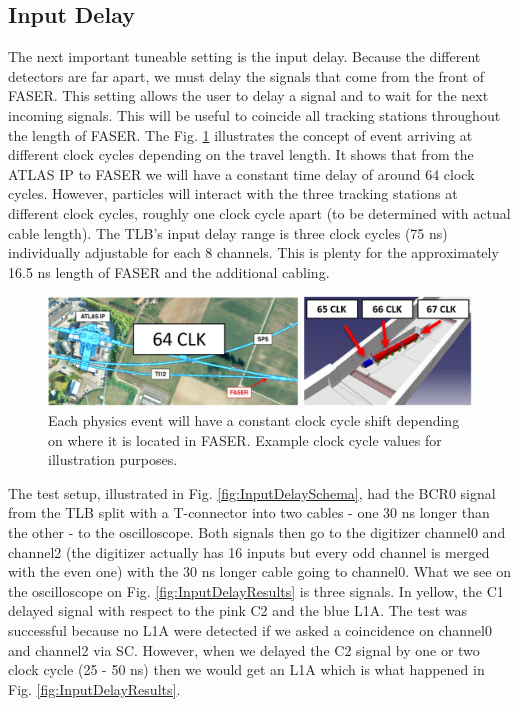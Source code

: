 \subsection{Input Delay}

The next important tuneable setting is the input delay. Because the different detectors are far apart, we must delay the signals that come from the front of FASER. This setting allows the user to delay a signal and to wait for the next incoming signals. This will be useful to coincide all tracking stations throughout the length of FASER. The Fig. \ref{fig:InputDelay} illustrates the concept of event arriving at different clock cycles depending on the travel length. It shows that from the ATLAS IP to FASER we will have a constant time delay of around 64 clock cycles. However, particles will interact with the three tracking stations at different clock cycles, roughly one clock cycle apart (to be determined with actual cable length). The TLB's input delay range is three clock cycles (75 ns) individually adjustable for each 8 channels. This is plenty for the approximately 16.5 ns length of FASER and the additional cabling.

\begin{figure}[htbp!] 
\centering    
\includegraphics[width=1.0\textwidth]{InputDelayIllustration.jpg}
\caption[Input Delay illustration]{Each physics event will have a constant clock cycle shift depending on where it is located in FASER. Example clock cycle values for illustration purposes.}
\label{fig:InputDelay}
\end{figure}

The test setup, illustrated in Fig. \ref{fig:InputDelaySchema}, had the BCR0 signal from the TLB split with a T-connector into two cables - one 30 ns longer than the other - to the oscilloscope. Both signals then go to the digitizer channel0 and channel2 (the digitizer actually has 16 inputs but every odd channel is merged with the even one) with the 30 ns longer cable going to channel0. What we see on the oscilloscope on Fig. \ref{fig:InputDelayResults} is three signals. In yellow, the C1 delayed signal with respect to the pink C2 and the blue L1A. The test was successful because no L1A were detected if we asked a coincidence on channel0 and channel2 via SC. However, when we delayed the C2 signal by one or two clock cycle (25 - 50 ns) then we would get an L1A which is what happened in Fig. \ref{fig:InputDelayResults}.

